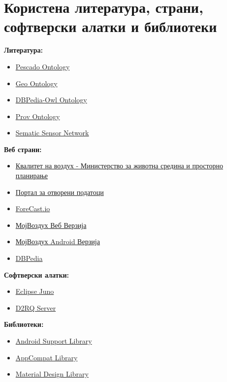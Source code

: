 \documentclass{uvamscse}
\begin{document}
\chapter{Користена литература, страни, софтверски алатки и библиотеки}

\textbf{\large{Литература:}}
\begin{itemize}
\item \href{https://ontohub.org/fois-ontology-competition/PESCaDO_Ontology}{Pescado Ontology}
\item \href{http://www.w3.org/2005/Incubator/geo/XGR-geo-ont-20071023/}{Geo Ontology}
\item \href{http://dbpedia.org/ontology/}{DBPedia-Owl Ontology}
\item \href{http://www.w3.org/TR/prov-o/}{Prov Ontology}
\item \href{http://www.w3.org/2005/Incubator/ssn/ssnx/ssn}{Sematic Sensor Network}
\end{itemize}


\textbf{\large{Веб страни:}}
\begin{itemize}
\item \href{http://airquality.moepp.gov.mk/}{Квалитет на воздух - Министерство за животна средина и просторно планирање}
\item \href{http://otvorenipodatoci.gov.mk/}{Портал за отворени податоци}
\item \href{http://forecast.io/}{ForeCast.io}
\item \href{http://gorjan.rocks/clients/airquality/}{МојВоздух Веб Верзија}
\item \href{https://play.google.com/store/apps/details?id=com.gorjan.airquality}{МојВоздух Android Верзија}
\item \href{http://dbpedia.org/}{DBPedia}
\end{itemize}


\textbf{\large{Софтверски алатки:}}
\begin{itemize}
\item \href{https://eclipse.org/}{Eclipse Juno}
\item \href{http://d2rq.org/d2r-server}{D2RQ Server}
\end{itemize}


\textbf{\large{Библиотеки:}}
\begin{itemize}
\item \href{http://developer.android.com/tools/support-library/index.html}{Android Support Library}
\item \href{http://android-developers.blogspot.com/2014/10/appcompat-v21-material-design-for-pre.html}{AppCompat Library}
\item \href{https://github.com/navasmdc/MaterialDesignLibrary}{Material Design Library}
\end{itemize}
\end{document}
